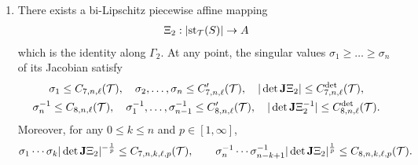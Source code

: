 \documentclass[10pt,a4paper]{article}
\begin{document}
\begin{proposition}
\begin{enumerate}
    \item 
    There exists a bi-Lipschitz piecewise affine mapping
    \begin{align*}
        \Xi_{2} : \left| \operatorname{st}_{{\mathcal T}}(S) \right| \rightarrow A
    \end{align*}
    which is the identity along $\Gamma_2$. 
    At any point, the singular values $\sigma_1 \geq \dots \geq \sigma_n$ of its Jacobian satisfy 
    \begin{gather*}
        \sigma_1 \leq C_{7,n,\ell}({\mathcal T}),
        \quad 
        \sigma_2,\dots,\sigma_n \leq C'_{7,n,\ell}({\mathcal T}),
        \quad 
        | \det{\mathbf{J}}\Xi_{2} |      \leq C^{\det}_{7,n,\ell}({\mathcal T}),
        \\
        \sigma_n^{-1} \leq C_{8,n,\ell}({\mathcal T}),
        \quad 
        \sigma_1^{-1},\dots,\sigma_{n-1}^{-1} \leq C'_{8,n,\ell}({\mathcal T}),
        \quad 
        | \det{\mathbf{J}}\Xi_{2}^{-1} | \leq C^{\det}_{8,n,\ell}({\mathcal T}).
    \end{gather*}
    Moreover, for any $0 \leq k \leq n$ and $p \in [1,\infty]$,
    \begin{align*}
        \sigma_{1}\cdots\sigma_{k} | \det{\mathbf{J}}\Xi_{2} |^{-\frac 1 p}
        \leq 
        C_{7,n,k,\ell,p}({\mathcal T}),
        \qquad 
        \sigma_{n}^{-1}\cdots\sigma_{n-k+1}^{-1} | \det{\mathbf{J}}\Xi_{2} |^{\frac 1 p}
        \leq 
        C_{8,n,k,\ell,p}({\mathcal T}).
    \end{align*}
    \end{enumerate}
\end{proposition}
\end{document}
